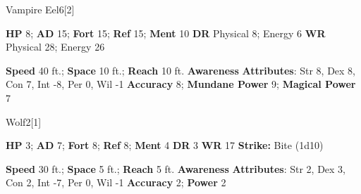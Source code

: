   \begin{monsection}{Vampire Eel}{6}[2]
    \vspace{-1em}\vspace{-1em}
    \begin{spellcontent}
      \begin{spelltargetinginfo}
        \pari \textbf{HP} 8;
          \textbf{AD} 15;
          \textbf{Fort} 15;
          \textbf{Ref} 15;
          \textbf{Ment} 10
        \pari \textbf{DR} Physical 8; Energy 6
        \pari \textbf{WR} Physical 28; Energy 26
        
      \end{spelltargetinginfo}
    \end{spellcontent}
    \begin{monsterfooter}
      \pari \textbf{Speed} 40 ft.;
        \textbf{Space} 10 ft.;
        \textbf{Reach} 10 ft.
      \pari \textbf{Awareness} 
      \pari \textbf{Attributes}:
        Str 8, Dex 8, Con 7,
        Int -8, Per 0, Wil -1
      \pari \textbf{Accuracy} 8;
        \textbf{Mundane Power} 9;
      \textbf{Magical Power} 7
    \end{monsterfooter}
  \end{monsection}
  
  
  \begin{monsection}{Wolf}{2}[1]
    \vspace{-1em}\vspace{-1em}
    \begin{spellcontent}
      \begin{spelltargetinginfo}
        \pari \textbf{HP} 3;
          \textbf{AD} 7;
          \textbf{Fort} 8;
          \textbf{Ref} 8;
          \textbf{Ment} 4
        \pari \textbf{DR} 3
        \pari \textbf{WR} 17
        \pari \textbf{Strike:}
            Bite  (1d10)
      \end{spelltargetinginfo}
    \end{spellcontent}
    \begin{monsterfooter}
      \pari \textbf{Speed} 30 ft.;
        \textbf{Space} 5 ft.;
        \textbf{Reach} 5 ft.
      \pari \textbf{Awareness} 
      \pari \textbf{Attributes}:
        Str 2, Dex 3, Con 2,
        Int -7, Per 0, Wil -1
      \pari \textbf{Accuracy} 2;
        \textbf{Power} 2
    \end{monsterfooter}
  \end{monsection}
  
